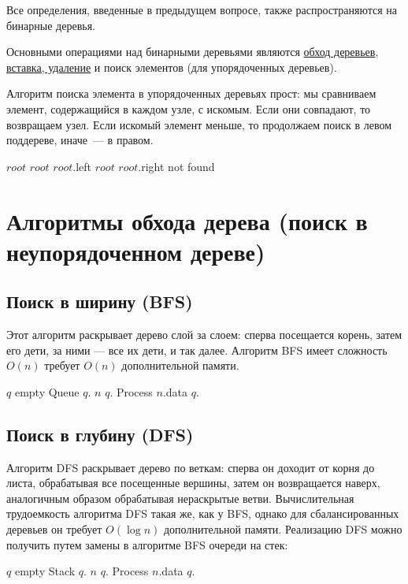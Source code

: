Все определения, введенные в предыдущем вопросе, также распространяются на бинарные деревья.

Основными операциями над бинарными деревьями являются \hyperref[sec:bintree-traversal]{обход деревьев},
\hyperref[sec:tree-ins-del]{вставка, удаление} и поиск элементов (для упорядоченных деревьев).

Алгоритм поиска элемента в упорядоченных деревьях прост: мы сравниваем элемент, содержащийся в каждом узле,
с искомым. Если они совпадают, то возвращаем узел. Если искомый элемент меньше, то продолжаем поиск в левом
поддереве, иначе~--- в правом.
\begin{algorithmic}
      \State \Return $root$
      \State $root$ \asgn $root$.left
    \Else
      \State $root$ \asgn $root$.right
    \EndIf
  \EndWhile
  \State \Return not found
\EndFunction
\end{algorithmic}

\section{Алгоритмы обхода дерева (поиск в неупорядоченном дереве)}
\label{sec:tree-traversal}

\subsection{Поиск в ширину (BFS)}
Этот алгоритм раскрывает дерево слой за слоем:
сперва посещается корень, затем его дети, за ними ---
все их дети, и так далее. Алгоритм BFS имеет сложность $O(n)$ требует
$O(n)$ дополнительной памяти.
\begin{algorithmic}
  \State $q$ \asgn empty Queue
  \State $q$.
    \State $n$ \asgn $q$.
    \State Process $n$.data
      $q$.
    \EndFor
  \EndWhile
\EndProcedure
\end{algorithmic}

\subsection{Поиск в глубину (DFS)}
Алгоритм DFS раскрывает дерево по веткам: сперва он доходит от корня до листа,
обрабатывая все посещенные вершины, затем он возвращается наверх, аналогичным
образом обрабатывая нераскрытые ветви. Вычислительная трудоемкость алгоритма
DFS такая же, как у BFS, однако для сбалансированных деревьев он требует $O(\log n)$
дополнительной памяти.
Реализацию DFS можно получить путем замены в алгоритме BFS очереди на стек:
\begin{algorithmic}
  \State $q$ \asgn empty Stack
  \State $q$.
    \State $n$ \asgn $q$.
    \State Process $n$.data
      $q$.
    \EndFor
  \EndWhile
\EndProcedure
\end{algorithmic}

